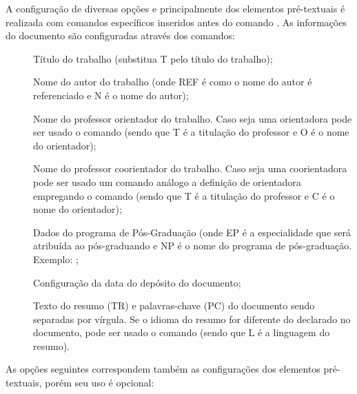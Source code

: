 A configuração de diversas opções e principalmente dos elementos pré-textuais é realizada com comandos específicos inseridos antes do comando . As informações do documento são configuradas através dos comandos:

\begin{description}

 \item[] Título do trabalho (substitua T pelo título do trabalho);

 \item[] Nome do autor do trabalho (onde REF é como o nome do autor é referenciado e N é o nome do autor);

 \item[] Nome do professor orientador do trabalho. Caso seja uma orientadora pode ser usado o comando  (sendo que T é a titulação do professor e O é o nome do orientador);

 \item[] Nome do professor coorientador do trabalho. Caso seja uma coorientadora pode ser usado um comando análogo a definição de orientadora  empregando o comando (sendo que T é a titulação do professor e C é o nome do orientador);

 
 \item[] Dados do programa de Pós-Graduação (onde EP é a especialidade que será atribuída ao pós-graduando e NP é o nome do programa de pós-graduação.  Exemplo: ;
 
 \item[] Configuração da data do depósito do documento;

 \item[] Texto do resumo (TR) e palavras-chave (PC) do documento sendo separadas por vírgula. Se o idioma do resumo for diferente do declarado no documento, pode ser usado o comando  (sendo que L é a linguagem do resumo).
 
\end{description}

As opções seguintes correspondem também as configurações dos elementos pré-textuais, porém seu uso é opcional: 

